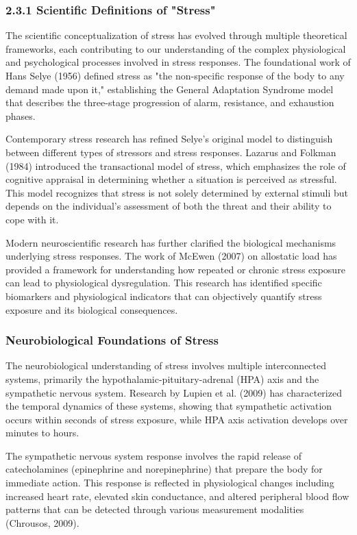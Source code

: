 \documentclass[12pt,a4paper]{article}
\begin{document}
\subsubsection{2.3.1 Scientific Definitions of "Stress"}

The scientific conceptualization of stress has evolved through multiple theoretical frameworks, each contributing to our
understanding of the complex physiological and psychological processes involved in stress responses. The foundational
work of Hans Selye (1956) defined stress as "the non-specific response of the body to any demand made upon it,"
establishing the General Adaptation Syndrome model that describes the three-stage progression of alarm, resistance, and
exhaustion phases.

Contemporary stress research has refined Selye's original model to distinguish between different types of stressors and
stress responses. Lazarus and Folkman (1984) introduced the transactional model of stress, which emphasizes the role of
cognitive appraisal in determining whether a situation is perceived as stressful. This model recognizes that stress is
not solely determined by external stimuli but depends on the individual's assessment of both the threat and their
ability to cope with it.

Modern neuroscientific research has further clarified the biological mechanisms underlying stress responses. The work of
McEwen (2007) on allostatic load has provided a framework for understanding how repeated or chronic stress exposure can
lead to physiological dysregulation. This research has identified specific biomarkers and physiological indicators that
can objectively quantify stress exposure and its biological consequences.

\subsubsection{Neurobiological Foundations of Stress}

The neurobiological understanding of stress involves multiple interconnected systems, primarily the
hypothalamic-pituitary-adrenal (HPA) axis and the sympathetic nervous system. Research by Lupien et al. (2009) has
characterized the temporal dynamics of these systems, showing that sympathetic activation occurs within seconds of
stress exposure, while HPA axis activation develops over minutes to hours.

The sympathetic nervous system response involves the rapid release of catecholamines (epinephrine and norepinephrine)
that prepare the body for immediate action. This response is reflected in physiological changes including increased
heart rate, elevated skin conductance, and altered peripheral blood flow patterns that can be detected through various
measurement modalities (Chrousos, 2009).
\end{document}
